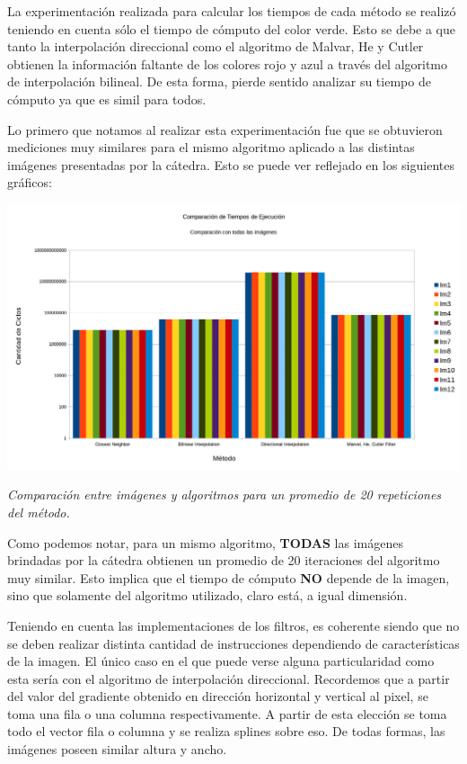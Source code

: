 \begin{itemize}
La experimentación realizada para calcular los tiempos de cada método se realizó teniendo en cuenta sólo el tiempo de cómputo del color verde. Esto se debe a que tanto la interpolación direccional como el algoritmo de Malvar, He y Cutler obtienen la información faltante de los colores rojo y azul a través del algoritmo de interpolación bilineal. De esta forma, pierde sentido analizar su tiempo de cómputo ya que es simil para todos.

Lo primero que notamos al realizar esta experimentación fue que se obtuvieron mediciones muy similares para el mismo algoritmo aplicado a las distintas imágenes presentadas por la cátedra. Esto se puede ver reflejado en los siguientes gráficos:

	\begin{center}
		\includegraphics[scale=0.4]{./img/comparacionMetodoImagen.png}
		\vspace{2pt}
		\par
		\footnotesize\textit{Comparación entre imágenes y algoritmos para un promedio de 20 repeticiones del método.}
	\end{center}

Como podemos notar, para un mismo algoritmo, \textbf{TODAS} las imágenes brindadas por la cátedra obtienen un promedio de 20 iteraciones del algoritmo muy similar. Esto implica que el tiempo de cómputo \textbf{NO} depende de la imagen, sino que solamente del algoritmo utilizado, claro está, a igual dimensión. 

Teniendo en cuenta las implementaciones de los filtros, es coherente siendo que no se deben realizar distinta cantidad de instrucciones dependiendo de características de la imagen. El único caso en el que puede verse alguna particularidad como esta sería con el algoritmo de interpolación direccional. Recordemos que a partir del valor del gradiente obtenido en dirección horizontal y vertical al pixel, se toma una fila o una columna respectivamente. A partir de esta elección se toma todo el vector fila o columna y se realiza splines sobre eso. De todas formas, las imágenes poseen similar altura y ancho.


\end{itemize}
